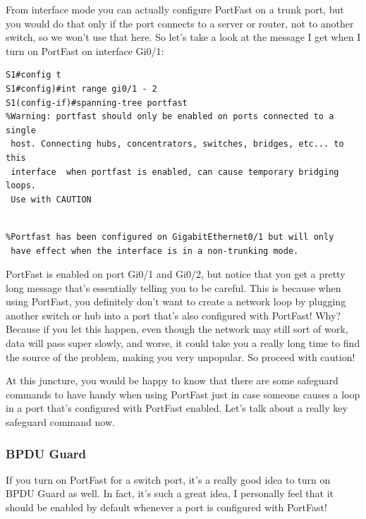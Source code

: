 \documentclass[b5paper,11pt]{memoir}
\begin{document}
From interface mode you can actually configure PortFast on a trunk port,
but you would do that only if the port connects to a server or router,
not to another switch, so we won't use that here. So let's take a look
at the message I get when I turn on PortFast on interface Gi0/1:

\begin{verbatim}
S1#config t
S1#config)#int range gi0/1 - 2
S1(config-if)#spanning-tree portfast
%Warning: portfast should only be enabled on ports connected to a single
 host. Connecting hubs, concentrators, switches, bridges, etc... to this
 interface  when portfast is enabled, can cause temporary bridging loops.
 Use with CAUTION
\end{verbatim}

\begin{verbatim}
 
%Portfast has been configured on GigabitEthernet0/1 but will only
 have effect when the interface is in a non-trunking mode.
\end{verbatim}

PortFast is enabled on port Gi0/1 and Gi0/2, but notice that you get a
pretty long message that's essentially telling you to be careful. This
is because when using PortFast, you definitely don't want to create a
network loop by plugging another switch or hub into a port that's also
configured with PortFast! Why? Because if you let this happen, even
though the network may still sort of work, data will pass super slowly,
and worse, it could take you a really long time to find the source of
the problem, making you very unpopular. So proceed with caution!

At this juncture, you would be happy to know that there are some
safeguard commands to have handy when using PortFast just in case
someone causes a loop in a port that's configured with PortFast enabled.
Let's talk about a really key safeguard command now.

\subsubsection[BPDU
Guard]{\texorpdfstring{\protect\hypertarget{c15.xhtmlux5cux23c15-sec-18}{}{}BPDU
Guard}{BPDU Guard}}

If you turn on PortFast for a switch port, it's a really good idea to
turn on BPDU Guard as well. In fact, it's such a great idea, I
personally feel that it should be enabled by default whenever a port is
configured with PortFast!
\end{document}
